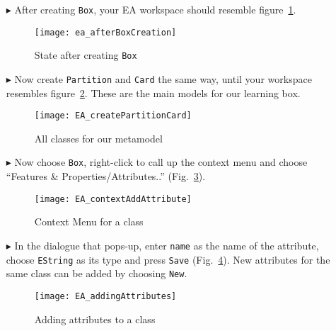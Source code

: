 \begin{itemize}
\vfill
\pagebreak

\item[$\blacktriangleright$] After creating \texttt{Box}, your EA workspace should resemble figure~\ref{fig:eclass_completed}.

\begin{figure}[htbp]
	\centering
  \texttt{[image: ea\_afterBoxCreation]}
	\caption{State after creating \texttt{Box}}
	\label{fig:eclass_completed}
\end{figure}

\item[$\blacktriangleright$] Now create \texttt{Partition} and \texttt{Card} the same way, until your workspace resembles figure~\ref{fig:all_eclasses}.
These are the main models for our learning box.

\vspace{1cm}

\begin{figure}[htbp]
	\centering
  \texttt{[image: EA\_createPartitionCard]}
	\caption{All classes for our metamodel}
	\label{fig:all_eclasses}
\end{figure}

\vfill
\pagebreak

\item[$\blacktriangleright$] Now choose \texttt{Box}, right-click to call up the context menu and choose ``Features \& Properties/Attributes..''
(Fig.~\ref{fig:attribute}).

\begin{figure}[htbp]
	\centering
  \texttt{[image: EA\_contextAddAttribute]}
	\caption{Context Menu for a class}
	\label{fig:attribute}
\end{figure}
\FloatBarrier

\vspace{0.5cm}

\item[$\blacktriangleright$] In the dialogue that pops-up, enter \texttt{name} as the name of the attribute, choose \texttt{EString} as its type and press
\texttt{Save} (Fig.~\ref{fig:attribute_properties}). New attributes for the same class can be added by choosing \texttt{New}.

\vspace{0.5cm}

\begin{figure}[htbp]
	\centering
  \texttt{[image: EA\_addingAttributes]}
	\caption{Adding attributes to a class}
	\label{fig:attribute_properties}
\end{figure}


\end{itemize}
